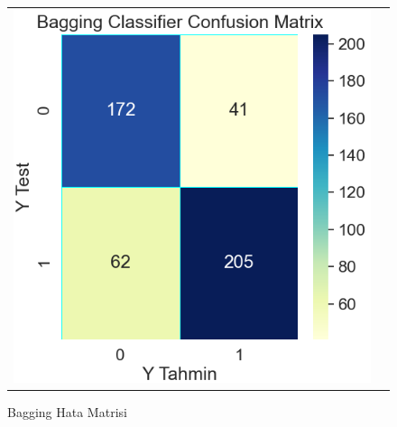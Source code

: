 \documentclass[conference]{IEEEtran}
\begin{document}
\begin{figure}[!h]
	\centering
	\begin{center}
		\begin{tabular}{cc}
			\includegraphics[scale=0.4]{pictures/pic_15.png}&
		\end{tabular}
	\end{center}
	\caption{Bagging Hata Matrisi}
	\label{fig:15}
\end{figure}
\pagebreak
\end{document}
